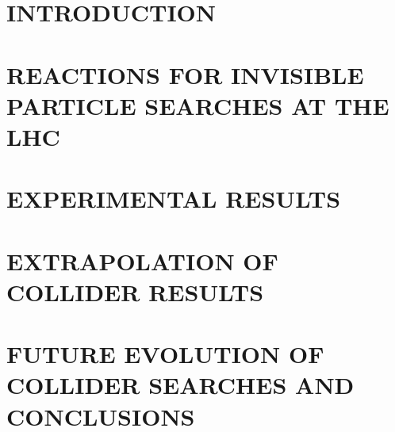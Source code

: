 \documentclass{ar-1col}
\begin{document}
\section{INTRODUCTION}
\label{sec:intro}

%



\section{REACTIONS FOR INVISIBLE PARTICLE SEARCHES AT THE LHC}
\label{sec:02_Reactions}


\section{EXPERIMENTAL RESULTS}
\label{sec:03_ExperimentalResults}


\section{EXTRAPOLATION OF COLLIDER RESULTS}
\label{sec:04_Extrapolation}


\section{FUTURE EVOLUTION OF COLLIDER SEARCHES AND CONCLUSIONS}
\label{sec:05_Future}



\clearpage

\end{document}

